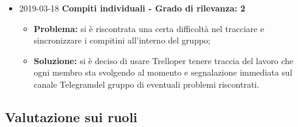 \begin{itemize}
		\item 2019-03-18 \textbf{Compiti individuali - Grado di rilevanza: 2} \\
		\begin{itemize}
			\item \textbf{Problema:} si è riscontrata una certa difficoltà nel tracciare e sincronizzare i compitini all'interno del gruppo;
			\item \textbf{Soluzione:} si è deciso di usare Trello\glosp per tenere traccia del lavoro che ogni membro sta svolgendo al momento e segnalazione immediata sul canale Telegram\glosp del gruppo di eventuali problemi riscontrati.
		\end{itemize}
		 		
\end{itemize}

\subsection{Valutazione sui ruoli}
